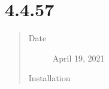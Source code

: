 \documentclass[letterpaper,10pt,english]{sphinxmanual}
\begin{document}
\section{ 4.4.5\sphinxhyphen{}7}
\label{\detokenize{release_notes/4.4.5-7:percona-server-for-mongodb-4-4-5-7}}\label{\detokenize{release_notes/4.4.5-7:psmdb-4-4-5-7}}\label{\detokenize{release_notes/4.4.5-7::doc}}\begin{quote}\begin{description}
\item[{Date}] \leavevmode
\sphinxAtStartPar
April 19, 2021

\item[{Installation}] \leavevmode
\sphinxAtStartPar
{}

\end{description}\end{quote}
\end{document}
